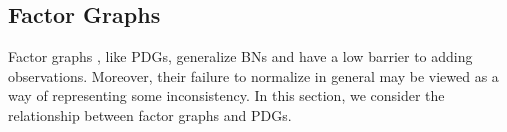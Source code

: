 \documentclass{article}
\theoremstyle{plain}
\theoremstyle{definition}
\theoremstyle{remark}
\numberwithin{equation}{section}
\begin{document}
	
	\subsection{Factor Graphs} \label{sec:factor-graphs}	
	Factor graphs \cite{KF09}, like PDGs, generalize BNs and have a
        low barrier to adding observations.  Moreover, their failure to
        normalize in general may be viewed as a way of representing
        some
        inconsistency.
        In this section, we consider the relationship between factor graphs
and PDGs.        
\end{document}
